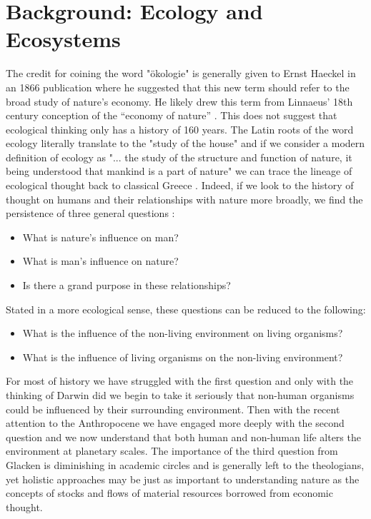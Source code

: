 \section {Background: Ecology and Ecosystems}

The credit for coining the word "ökologie" is generally given to Ernst Haeckel in an 1866 publication where he suggested that this new term should refer to the broad study of nature's economy. He likely drew this term from Linnaeus’ 18th century conception of the “economy of nature” \cite{worster_1977}. This does not suggest that ecological thinking only has a history of 160 years. The Latin roots of the word ecology literally translate to the "study of the house" and if we consider a modern definition of ecology as "... the study of the structure and function of nature, it being understood that mankind is a part of nature" we can trace the lineage of ecological thought back to classical Greece \cite{odum_1953}. Indeed, if we look to the history of thought on humans and their relationships with nature more broadly, we find the persistence of three general questions \cite{glacken_1967}: \begin{itemize} \item What is nature's influence on man? \item What is man's influence on nature? \item Is there a grand purpose in these relationships? \end{itemize} Stated in a more ecological sense, these questions can be reduced to the following: \begin{itemize} \item What is the influence of the non-living environment on living organisms? \item What is the influence of living organisms on the non-living environment? \end{itemize} For most of history we have struggled with the first question and only with the thinking of Darwin did we begin to take it seriously that non-human organisms could be influenced by their surrounding environment. Then with the recent attention to the Anthropocene we have engaged more deeply with the second question and we now understand that both human and non-human life alters the environment at planetary scales. The importance of the third question from Glacken is diminishing in academic circles and is generally left to the theologians, yet holistic approaches may be just as important to understanding nature as the concepts of stocks and flows of material resources borrowed from economic thought. 


